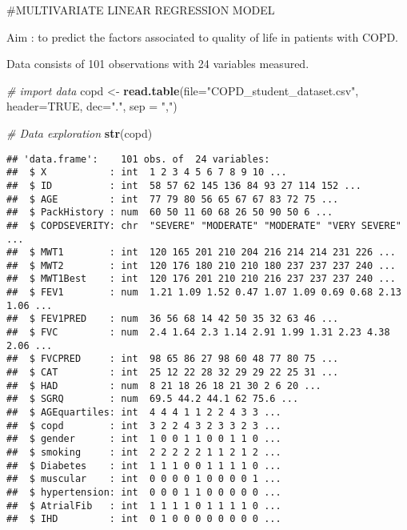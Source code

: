 \documentclass[
]{article}
\newenvironment{Shaded}{\begin{snugshade}}{\end{snugshade}}
\newcommand{\AttributeTok}[1]{\textcolor[rgb]{0.13,0.29,0.53}{#1}}
\newcommand{\CommentTok}[1]{\textcolor[rgb]{0.56,0.35,0.01}{\textit{#1}}}
\newcommand{\ConstantTok}[1]{\textcolor[rgb]{0.56,0.35,0.01}{#1}}
\newcommand{\FunctionTok}[1]{\textcolor[rgb]{0.13,0.29,0.53}{\textbf{#1}}}
\newcommand{\NormalTok}[1]{#1}
\newcommand{\OtherTok}[1]{\textcolor[rgb]{0.56,0.35,0.01}{#1}}
\newcommand{\StringTok}[1]{\textcolor[rgb]{0.31,0.60,0.02}{#1}}
\begin{document}
\#MULTIVARIATE LINEAR REGRESSION MODEL

Aim : to predict the factors associated to quality of life in patients
with COPD.

Data consists of 101 observations with 24 variables measured.

\begin{Shaded}
\begin{Highlighting}[]
\CommentTok{\# import data}
\NormalTok{copd }\OtherTok{\textless{}{-}} \FunctionTok{read.table}\NormalTok{(}\AttributeTok{file=}\StringTok{"COPD\_student\_dataset.csv"}\NormalTok{, }\AttributeTok{header=}\ConstantTok{TRUE}\NormalTok{, }\AttributeTok{dec=}\StringTok{"."}\NormalTok{, }\AttributeTok{sep =} \StringTok{","}\NormalTok{)}
\end{Highlighting}
\end{Shaded}

\begin{Shaded}
\begin{Highlighting}[]
\CommentTok{\# Data exploration }
\FunctionTok{str}\NormalTok{(copd)}
\end{Highlighting}
\end{Shaded}

\begin{verbatim}
## 'data.frame':    101 obs. of  24 variables:
##  $ X           : int  1 2 3 4 5 6 7 8 9 10 ...
##  $ ID          : int  58 57 62 145 136 84 93 27 114 152 ...
##  $ AGE         : int  77 79 80 56 65 67 67 83 72 75 ...
##  $ PackHistory : num  60 50 11 60 68 26 50 90 50 6 ...
##  $ COPDSEVERITY: chr  "SEVERE" "MODERATE" "MODERATE" "VERY SEVERE" ...
##  $ MWT1        : int  120 165 201 210 204 216 214 214 231 226 ...
##  $ MWT2        : int  120 176 180 210 210 180 237 237 237 240 ...
##  $ MWT1Best    : int  120 176 201 210 210 216 237 237 237 240 ...
##  $ FEV1        : num  1.21 1.09 1.52 0.47 1.07 1.09 0.69 0.68 2.13 1.06 ...
##  $ FEV1PRED    : num  36 56 68 14 42 50 35 32 63 46 ...
##  $ FVC         : num  2.4 1.64 2.3 1.14 2.91 1.99 1.31 2.23 4.38 2.06 ...
##  $ FVCPRED     : int  98 65 86 27 98 60 48 77 80 75 ...
##  $ CAT         : int  25 12 22 28 32 29 29 22 25 31 ...
##  $ HAD         : num  8 21 18 26 18 21 30 2 6 20 ...
##  $ SGRQ        : num  69.5 44.2 44.1 62 75.6 ...
##  $ AGEquartiles: int  4 4 4 1 1 2 2 4 3 3 ...
##  $ copd        : int  3 2 2 4 3 2 3 3 2 3 ...
##  $ gender      : int  1 0 0 1 1 0 0 1 1 0 ...
##  $ smoking     : int  2 2 2 2 2 1 1 2 1 2 ...
##  $ Diabetes    : int  1 1 1 0 0 1 1 1 1 0 ...
##  $ muscular    : int  0 0 0 0 1 0 0 0 0 1 ...
##  $ hypertension: int  0 0 0 1 1 0 0 0 0 0 ...
##  $ AtrialFib   : int  1 1 1 1 0 1 1 1 1 0 ...
##  $ IHD         : int  0 1 0 0 0 0 0 0 0 0 ...
\end{verbatim}
\end{document}
